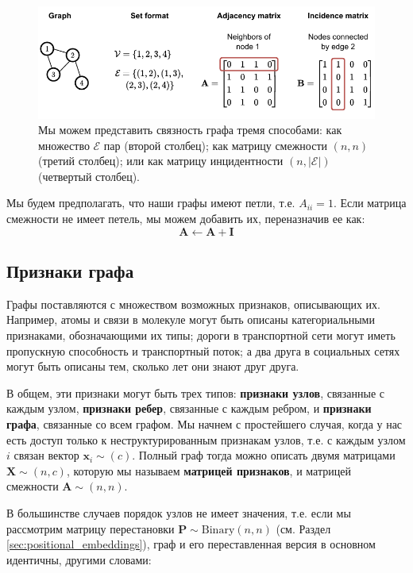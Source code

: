 \begin{figure}[t]
    \centering
    \includegraphics[width=1.0\textwidth]{images/graphs-2}
    \caption{Мы можем представить связность графа тремя способами: как множество $\mathcal{E}$ пар (второй столбец); как матрицу смежности $(n, n)$ (третий столбец); или как матрицу инцидентности $(n, \lvert \mathcal{E} \rvert)$ (четвертый столбец).}
    \label{fig:adjacency_matrix}
\end{figure}

Мы будем предполагать, что наши графы имеют петли, т.е. $A_{ii} = 1$. Если матрица смежности не имеет петель, мы можем добавить их, переназначив ее как:
%
$$\mathbf{A} \gets\mathbf{A} + \mathbf{I}$$

\subsection{Признаки графа}

Графы поставляются с множеством возможных признаков, описывающих их. Например, атомы и связи в молекуле могут быть описаны категориальными признаками, обозначающими их типы; дороги в транспортной сети могут иметь пропускную способность и транспортный поток; а два друга в социальных сетях могут быть описаны тем, сколько лет они знают друг друга.

В общем, эти признаки могут быть трех типов: \textbf{признаки узлов}, связанные с каждым узлом, \textbf{признаки ребер}, связанные с каждым ребром, и \textbf{признаки графа}, связанные со всем графом. Мы начнем с простейшего случая, когда у нас есть доступ только к неструктурированным признакам узлов, т.е. с каждым узлом $i$ связан вектор $\mathbf{x}_i \sim (c)$. Полный граф тогда можно описать двумя матрицами $\mathbf{X} \sim (n,c)$, которую мы называем \textbf{матрицей признаков}, и матрицей смежности $\mathbf{A} \sim (n,n)$.

В большинстве случаев порядок узлов не имеет значения, т.е. если мы рассмотрим матрицу перестановки $\mathbf{P} \sim \text{Binary}(n,n)$ (см. Раздел \ref{sec:positional_embeddings}), граф и его переставленная версия в основном идентичны, другими словами:

